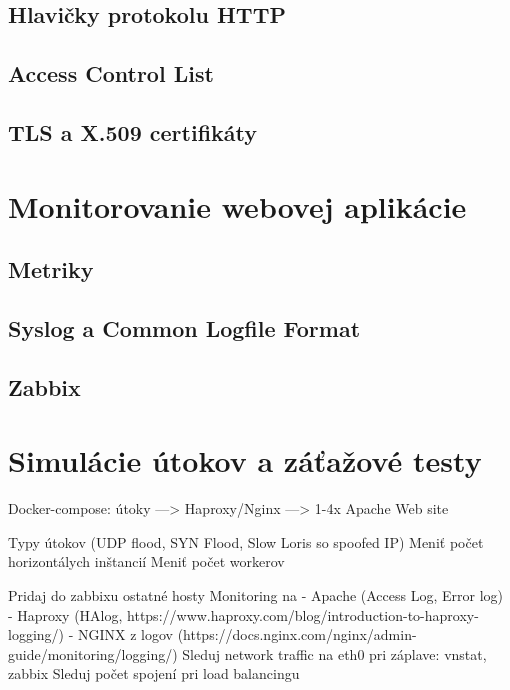\documentclass[12pt, a4paper]{article}
\begin{document}
\subsection{Hlavičky protokolu HTTP}

\subsection{Access Control List}

\subsection{TLS a X.509 certifikáty}



\section{Monitorovanie webovej aplikácie}

\subsection{Metriky}

\subsection{Syslog a Common Logfile Format}

\subsection{Zabbix}

\section{Simulácie útokov a záťažové testy}
Docker-compose: útoky ---> Haproxy/Nginx ---> 1-4x Apache Web site

Typy útokov (UDP flood, SYN Flood, Slow Loris so spoofed IP)
Meniť počet horizontálych inštancií
Meniť počet workerov

Pridaj do zabbixu ostatné hosty
Monitoring na 
	- Apache (Access Log, Error log)
	- Haproxy (HAlog, https://www.haproxy.com/blog/introduction-to-haproxy-logging/)
	- NGINX z logov (https://docs.nginx.com/nginx/admin-guide/monitoring/logging/)
Sleduj network traffic na eth0 pri záplave:  vnstat, zabbix
Sleduj počet spojení pri load balancingu
\end{document}
